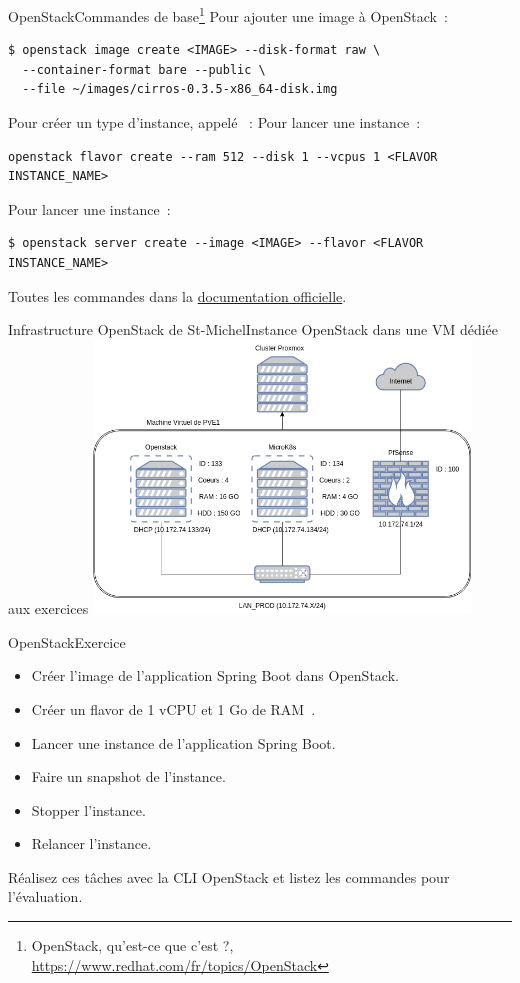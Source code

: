 \documentclass{beamer}
\begin{document}
    \begin{frame}[fragile]{OpenStack}{Commandes de base\footnote{\label{opentackcommand}OpenStack, qu'est-ce que c'est ?, \url{https://www.redhat.com/fr/topics/OpenStack}}}
        Pour ajouter une image à OpenStack~:
        \begin{lstlisting}
$ openstack image create <IMAGE> --disk-format raw \
  --container-format bare --public \
  --file ~/images/cirros-0.3.5-x86_64-disk.img
        \end{lstlisting}
        Pour créer un type d'instance, appelé ~:
        Pour lancer une instance~:
        \begin{lstlisting}
openstack flavor create --ram 512 --disk 1 --vcpus 1 <FLAVOR INSTANCE_NAME>
        \end{lstlisting}
        Pour lancer une instance~:
        \begin{lstlisting}
$ openstack server create --image <IMAGE> --flavor <FLAVOR INSTANCE_NAME>
        \end{lstlisting}
        \bigbreak
        Toutes les commandes dans la \href{https://docs.OpenStack.org/ocata/user-guide/cli-cheat-sheet.html}{documentation officielle}.
    \end{frame}
    \begin{frame}{Infrastructure OpenStack de St-Michel}{Instance OpenStack dans une VM dédiée aux exercices}
        \bigbreak
        \centering
        \includegraphics[width=10cm]{image/infra.drawio}
    \end{frame}
    \begin{frame}{OpenStack}{Exercice \execcounterdispinc{}}
        \begin{itemize}
            \item Créer l'image de l'application Spring Boot dans OpenStack.
            \item Créer un flavor de 1 vCPU et 1 Go de RAM~.
            \item Lancer une instance de l'application Spring Boot.
            \item Faire un snapshot de l'instance.
            \item Stopper l'instance.
            \item Relancer l'instance.
        \end{itemize}
        Réalisez ces tâches avec la CLI OpenStack et listez les commandes pour l'évaluation.
    \end{frame}
\end{document}
